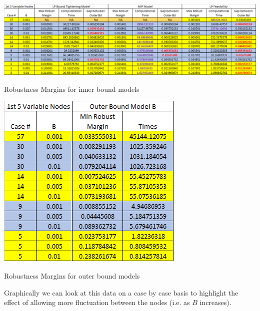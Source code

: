 \documentclass[11pt]{article}
\theoremstyle{plain}
\theoremstyle{definition}
\theoremstyle{remark}
\begin{document}
\begin{table}[h]\label{tbl:Table1}
\begin{center}
\includegraphics[scale=0.5]{Figures/InnerBoundTable}
\caption{Robustness Margins for inner bound models } 
\vspace{0.2in}
\includegraphics[scale=0.5]{Figures/OuterBoundTable}
\caption{Robustness Margins for outer bound models}
\end{center}
\end{table} 

Graphically we can look at this data on a case by case basis to highlight the effect of allowing more fluctuation between the nodes (i.e. as $B$ increases). \\
\end{document}
